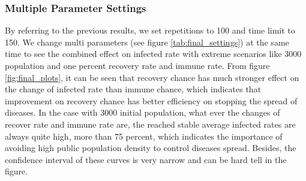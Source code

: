 \documentclass[a4paper,reqno,]{article}
\begin{document}
\subsubsection{Multiple Parameter Settings}
By referring to the previous results, we set repetitions to 100 and time limit to 150. We change multi parameters (see figure \ref{tab:final_settings}) at the same time to see the combined effect on infected rate with extreme scenarios like 3000 population and one percent recovery rate and immune rate. From figure \ref{fig:final_plots}, it can be seen that recovery chance has much stronger effect on the change of infected rate than immune chance, which indicates that improvement on recovery chance has better efficiency on stopping the spread of diseases. In the case with 3000 initial population, what ever the changes of recover rate and immune rate are, the reached stable average infected rates are always quite high, more than 75 percent, which indicates the importance of avoiding high public population density to control diseases spread. Besides, the confidence interval of these curves is very narrow and can be hard tell in the figure.
\end{document}
